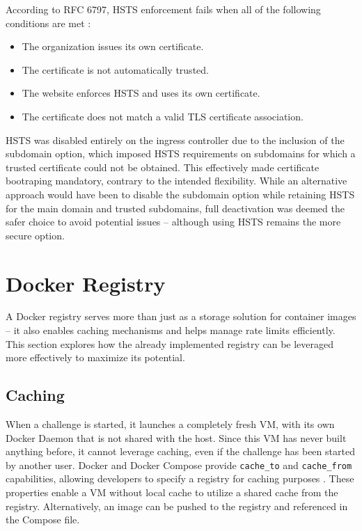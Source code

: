 According to RFC 6797, HSTS enforcement fails when all of the following conditions are met \parencite{rfc6797}:

\begin{itemize}
    \item The organization issues its own certificate.
    \item The certificate is not automatically trusted.
    \item The website enforces HSTS and uses its own certificate.
    \item The certificate does not match a valid TLS certificate association.
\end{itemize}

HSTS was disabled entirely on the ingress controller due to the inclusion of the subdomain option, which imposed HSTS requirements on subdomains for which a trusted certificate could not be obtained. This effectively made certificate bootraping mandatory, contrary to the intended flexibility. While an alternative approach would have been to disable the subdomain option while retaining HSTS for the main domain and trusted subdomains, full deactivation was deemed the safer choice to avoid potential issues -- although using HSTS remains the more secure option.

\section{Docker Registry}
A Docker registry serves more than just as a storage solution for container images -- it also enables caching mechanisms and helps manage rate limits efficiently. This section explores how the already implemented registry can be leveraged more effectively to maximize its potential.

\subsection{Caching}
When a challenge is started, it launches a completely fresh VM, with its own Docker Daemon that is not shared with the host. Since this VM has never built anything before, it cannot leverage caching, even if the challenge has been started by another user. Docker and Docker Compose provide \texttt{cache\_to} and \texttt{cache\_from} capabilities, allowing developers to specify a registry for caching purposes \parencite{docker_cache}\parencite{docker_compose_build}. These properties enable a VM without local cache to utilize a shared cache from the registry. Alternatively, an image can be pushed to the registry and referenced in the Compose file.

